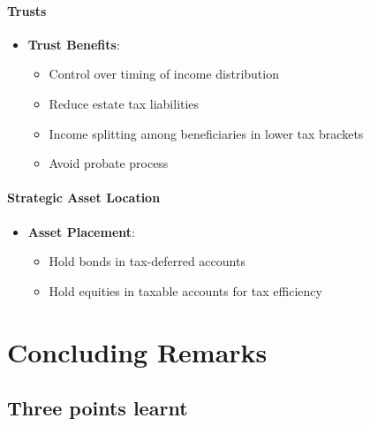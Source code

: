 \documentclass[
]{book}
\providecommand{\tightlist}{%
  \setlength{\itemsep}{0pt}\setlength{\parskip}{0pt}}
\begin{document}
\hypertarget{trusts}{%
\subsubsection{Trusts}\label{trusts}}

\begin{itemize}
\tightlist
\item
  \textbf{Trust Benefits}:

  \begin{itemize}
  \tightlist
  \item
    Control over timing of income distribution
  \item
    Reduce estate tax liabilities
  \item
    Income splitting among beneficiaries in lower tax brackets
  \item
    Avoid probate process
  \end{itemize}
\end{itemize}

\hypertarget{strategic-asset-location}{%
\subsubsection{Strategic Asset
Location}\label{strategic-asset-location}}

\begin{itemize}
\tightlist
\item
  \textbf{Asset Placement}:

  \begin{itemize}
  \tightlist
  \item
    Hold bonds in tax-deferred accounts
  \item
    Hold equities in taxable accounts for tax efficiency
  \end{itemize}
\end{itemize}

\hypertarget{concluding-remarks}{%
\chapter*{Concluding Remarks}\label{concluding-remarks}}

\hypertarget{three-points-learnt}{%
\section*{Three points learnt}\label{three-points-learnt}}
\end{document}
